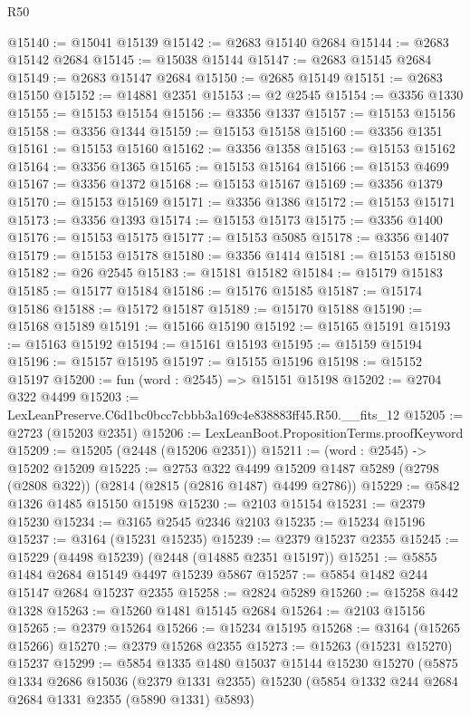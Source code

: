 \begin{lexlean}{R50}
\begin{coremodule}
@15140 := @15041 @15139
@15142 := @2683 @15140 @2684
@15144 := @2683 @15142 @2684
@15145 := @15038 @15144
@15147 := @2683 @15145 @2684
@15149 := @2683 @15147 @2684
@15150 := @2685 @15149
@15151 := @2683 @15150
@15152 := @14881 @2351
@15153 := @2 @2545
@15154 := @3356 @1330
@15155 := @15153 @15154
@15156 := @3356 @1337
@15157 := @15153 @15156
@15158 := @3356 @1344
@15159 := @15153 @15158
@15160 := @3356 @1351
@15161 := @15153 @15160
@15162 := @3356 @1358
@15163 := @15153 @15162
@15164 := @3356 @1365
@15165 := @15153 @15164
@15166 := @15153 @4699
@15167 := @3356 @1372
@15168 := @15153 @15167
@15169 := @3356 @1379
@15170 := @15153 @15169
@15171 := @3356 @1386
@15172 := @15153 @15171
@15173 := @3356 @1393
@15174 := @15153 @15173
@15175 := @3356 @1400
@15176 := @15153 @15175
@15177 := @15153 @5085
@15178 := @3356 @1407
@15179 := @15153 @15178
@15180 := @3356 @1414
@15181 := @15153 @15180
@15182 := @26 @2545
@15183 := @15181 @15182
@15184 := @15179 @15183
@15185 := @15177 @15184
@15186 := @15176 @15185
@15187 := @15174 @15186
@15188 := @15172 @15187
@15189 := @15170 @15188
@15190 := @15168 @15189
@15191 := @15166 @15190
@15192 := @15165 @15191
@15193 := @15163 @15192
@15194 := @15161 @15193
@15195 := @15159 @15194
@15196 := @15157 @15195
@15197 := @15155 @15196
@15198 := @15152 @15197
@15200 := fun (word : @2545) => @15151 @15198
@15202 := @2704 @322 @4499
@15203 := LexLeanPreserve.C6d1bc0bcc7cbbb3a169c4e838883ff45.R50.__fits_12
@15205 := @2723 (@15203 @2351)
@15206 := LexLeanBoot.PropositionTerms.proofKeyword
@15209 := @15205 (@2448 (@15206 @2351))
@15211 := (word : @2545) -> @15202 @15209
@15225 := @2753
    @322
    @4499
    @15209
    @1487
    @5289
    (@2798 (@2808 @322))
    (@2814 (@2815 (@2816 @1487) @4499 @2786))
@15229 := @5842 @1326 @1485 @15150 @15198
@15230 := @2103 @15154
@15231 := @2379 @15230
@15234 := @3165 @2545 @2346 @2103
@15235 := @15234 @15196
@15237 := @3164 (@15231 @15235)
@15239 := @2379 @15237 @2355
@15245 := @15229 (@4498 @15239) (@2448 (@14885 @2351 @15197))
@15251 := @5855 @1484 @2684 @15149 @4497 @15239 @5867
@15257 := @5854 @1482 @244 @15147 @2684 @15237 @2355
@15258 := @2824 @5289
@15260 := @15258 @442 @1328
@15263 := @15260 @1481 @15145 @2684
@15264 := @2103 @15156
@15265 := @2379 @15264
@15266 := @15234 @15195
@15268 := @3164 (@15265 @15266)
@15270 := @2379 @15268 @2355
@15273 := @15263 (@15231 @15270) @15237
@15299 := @5854
    @1335
    @1480
    @15037
    @15144
    @15230
    @15270
    (@5875
      @1334
      @2686
      @15036
      (@2379 @1331 @2355)
      @15230
      (@5854 @1332 @244 @2684 @2684 @1331 @2355 (@5890 @1331) @5893)

\end{coremodule}
\end{lexlean}
